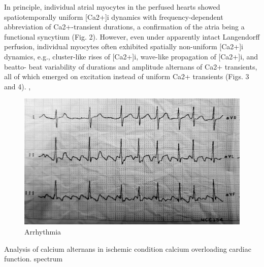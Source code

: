 \documentclass[a4paper,12pt]{article}
\begin{document}
\fi

In principle, individual atrial myocytes in the perfused
hearts showed spatiotemporally uniform [Ca2+]i dynamics
with frequency-dependent abbreviation of Ca2+-transient
durations, a confirmation of the atria being a functional
syncytium (Fig. 2). However, even under apparently intact
Langendorff perfusion, individual myocytes often exhibited
spatially non-uniform [Ca2+]i dynamics, e.g., cluster-like
rises of [Ca2+]i, wave-like propagation of [Ca2+]i, and beatto-
beat variability of durations and amplitude alternans of
Ca2+ transients, all of which emerged on excitation instead
of uniform Ca2+ transients (Figs. 3 and 4). \cite{jiang2014pacing}, \cite{aguirre2014intravital}

\begin{figure}
    \includegraphics[width=\linewidth]{fig0.jpg}
    \caption{Arrhythmia}
    \label{fig:fig0}
\end{figure}

Analysis of calcium alternans in ischemic condition
calcium overloading
cardiac function.
spectrum



\end{document}
